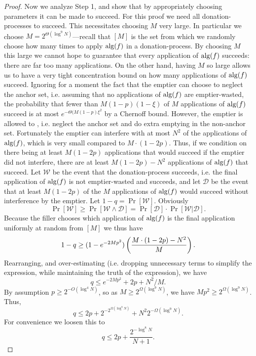 \begin{proof}
  Now we analyze Step 1, and show that by appropriately choosing
  parameters it can be made to succeed. For this proof we need
  all donation-processes to succeed. This necessitates choosing
  $M$ very large. In particular we choose $M = 2^{\Theta(\log^9
  N)}$---recall that $[M]$ is the set from which we randomly choose
  how many times to apply $\operatorname{\text{\textup{alg}}}(f)$ in a donation-process. By
  choosing $M$ this large we cannot hope to guarantee that every
  application of $\operatorname{\text{\textup{alg}}}(f)$ succeeds: there are far too many
  applications. On the other hand, having $M$ so large allows us
  to have a very tight concentration bound on how many
  applications of $\operatorname{\text{\textup{alg}}}(f)$ succeed. Ignoring for a moment the
  fact that the emptier can choose to neglect the anchor set,
  i.e. assuming that no applications of $\operatorname{\text{\textup{alg}}}(f)$ are
  emptier-wasted, the probability that fewer than
  $M(1-p)(1-\xi)$ of $M$ applications of $\operatorname{\text{\textup{alg}}}(f)$ succeed is at most
  $e^{-\Theta(M(1-p)\xi^2}$ by a Chernoff bound. However, the emptier is
  allowed to , i.e. neglect the anchor set and do
  extra emptying in the non-anchor set. Fortunately the emptier
  can interfere with at most $N^2$ of the applications of
  $\operatorname{\text{\textup{alg}}}(f)$, which is very small compared to $M\cdot (1-2p)$.
  Thus, if we condition on there being at least $M(1-2p)$
  applications that would succeed if the emptier did not
  interfere, there are at least $M(1-2p)-N^2$ applications of
  $\operatorname{\text{\textup{alg}}}(f)$ that succeed. Let $\mathcal{W}$ be the event that the
  donation-process succeeds, i.e. the final application of
  $\operatorname{\text{\textup{alg}}}(f)$ is not emptier-wasted and succeeds, and let
  $\mathcal{D}$ be the event that at least $M(1-2p)$ of the $M$
  applications of $\operatorname{\text{\textup{alg}}}(f)$ would succeed without  interference
  by the emptier. Let $1-q = \Pr[\mathcal{W}]$. Obviously
  $$\Pr[\mathcal{W}] \ge \Pr[\mathcal{W} \land \mathcal{D}] =
  \Pr[\mathcal{D}] \cdot \Pr[\mathcal{W} | \mathcal{D}].$$
  Because the filler chooses which application of $\operatorname{\text{\textup{alg}}}(f)$ is
  the final application uniformly at random from $[M]$ we thus
  have $$1-q \ge (1-e^{-2Mp^2})\left( \frac{M\cdot
  (1-2p)-N^2}{M} \right).$$ Rearranging, and over-estimating (i.e.
  dropping unnecessary terms to simplify the expression, while
  maintaining the truth of the expression), we have $$q \le
  e^{-2Mp^2} + 2p + N^2/M.$$ By assumption $p \ge
  2^{-O(\log^4 N)}$, so as $M \ge 2^{\Omega(\log^9 N)}$, we have
  $Mp^2 \ge 2^{\Omega(\log^9 N)}$. Thus,
  $$q \le 2p + 2^{-2^{\Omega(\log^9 N)}} +
  N^2 2^{-\Omega(\log^{9} N)}.$$ 
  For convenience we loosen this to $$q \le 2p + \frac{2^{-\log^8 N}}{N+1}.$$


\end{proof}
